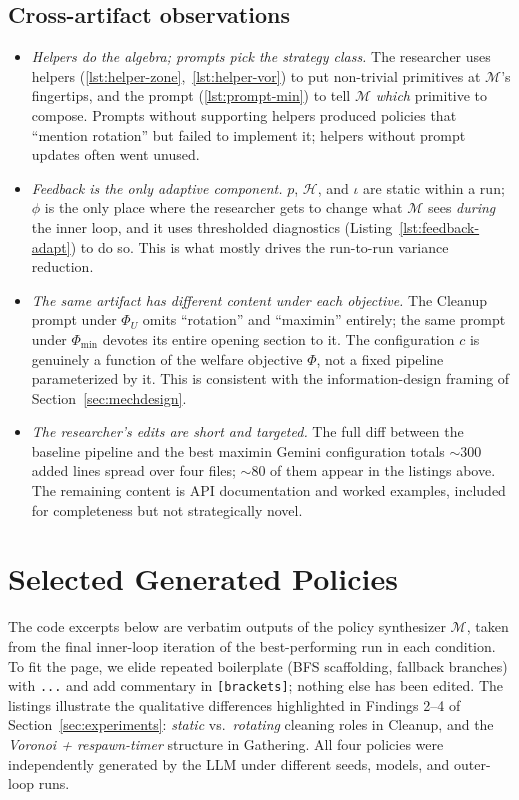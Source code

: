\documentclass{article}
\newcommand{\cM}{\mathcal{M}}
\begin{document}
\subsection{Cross-artifact observations}
\label{app:art-cross}

\begin{itemize}
  \item \emph{Helpers do the algebra; prompts pick the strategy class.} The researcher uses helpers (\ref{lst:helper-zone},~\ref{lst:helper-vor}) to put non-trivial primitives at $\cM$'s fingertips, and the prompt (\ref{lst:prompt-min}) to tell $\cM$ \emph{which} primitive to compose. Prompts without supporting helpers produced policies that ``mention rotation'' but failed to implement it; helpers without prompt updates often went unused.
  \item \emph{Feedback is the only adaptive component.} $p$, $\mathcal{H}$, and $\iota$ are static within a run; $\phi$ is the only place where the researcher gets to change what $\cM$ sees \emph{during} the inner loop, and it uses thresholded diagnostics (Listing~\ref{lst:feedback-adapt}) to do so. This is what mostly drives the run-to-run variance reduction.
  \item \emph{The same artifact has different content under each objective.} The Cleanup prompt under $\Phi_U$ omits ``rotation'' and ``maximin'' entirely; the same prompt under $\Phi_{\min}$ devotes its entire opening section to it. The configuration $c$ is genuinely a function of the welfare objective $\Phi$, not a fixed pipeline parameterized by it. This is consistent with the information-design framing of Section~\ref{sec:mechdesign}.
  \item \emph{The researcher's edits are short and targeted.} The full diff between the baseline pipeline and the best maximin Gemini configuration totals ${\sim}300$ added lines spread over four files; ${\sim}80$ of them appear in the listings above. The remaining content is API documentation and worked examples, included for completeness but not strategically novel.
\end{itemize}

\section{Selected Generated Policies}
\label{app:policies}

The code excerpts below are verbatim outputs of the policy synthesizer $\cM$, taken from the final inner-loop iteration of the best-performing run in each condition. To fit the page, we elide repeated boilerplate (BFS scaffolding, fallback branches) with \texttt{...} and add commentary in \texttt{[brackets]}; nothing else has been edited. The listings illustrate the qualitative differences highlighted in Findings 2--4 of Section~\ref{sec:experiments}: \emph{static} vs.\ \emph{rotating} cleaning roles in Cleanup, and the \emph{Voronoi + respawn-timer} structure in Gathering. All four policies were independently generated by the LLM under different seeds, models, and outer-loop runs.
\end{document}
